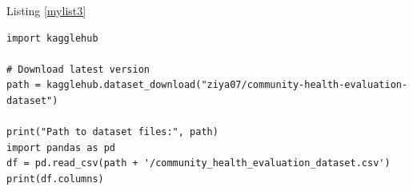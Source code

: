 \documentclass[10pt, conference, compsocconf]{IEEEtran}
\begin{document}
\lipsum[4]
  

Listing \ref{mylist3} \lipsum[1]
\begin{lstlisting}[style=clean , label={mylist3}, caption={Recursive Factorial Function}, linewidth=\columnwidth] 
import kagglehub

# Download latest version
path = kagglehub.dataset_download("ziya07/community-health-evaluation-dataset")

print("Path to dataset files:", path)
import pandas as pd
df = pd.read_csv(path + '/community_health_evaluation_dataset.csv')
print(df.columns)
\end{lstlisting}




\end{document}
